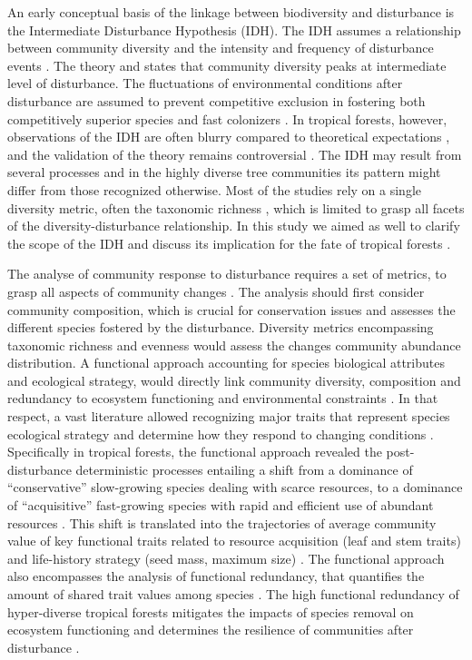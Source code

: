 \documentclass[fleqn,10pt]{ArtEcoFoG} %
\begin{document}
An early conceptual basis of the linkage between biodiversity and
disturbance is the Intermediate Disturbance Hypothesis (IDH). The IDH
assumes a relationship between community diversity and the intensity and
frequency of disturbance events \citep{Connell1978}. The theory and
states that community diversity peaks at intermediate level of
disturbance. The fluctuations of environmental conditions after
disturbance are assumed to prevent competitive exclusion in fostering
both competitively superior species and fast colonizers
\citep{Shea2004, Pulsford2016}. In tropical forests, however,
observations of the IDH are often blurry compared to theoretical
expectations \citep{Hugues2007, Sheil2003, Norden2017}, and the
validation of the theory remains controversial
\citep{Hubbell2001, Fox2013, Sheil2013}. The IDH may result from several
processes and in the highly diverse tree communities its pattern might
differ from those recognized otherwise. Most of the studies rely on a
single diversity metric, often the taxonomic richness
\citep{Molino2001}, which is limited to grasp all facets of the
diversity-disturbance relationship. In this study we aimed as well to
clarify the scope of the IDH and discuss its implication for the fate of
tropical forests \citep{Sheil2003, Shea2004}.

The analyse of community response to disturbance requires a set of
metrics, to grasp all aspects of community changes
\citep{Sheil2003, Shea2004, Mayfield2010}. The analysis should first
consider community composition, which is crucial for conservation issues
\citep{Lavorel2002, Bellwood2006} and assesses the different species
fostered by the disturbance. Diversity metrics encompassing taxonomic
richness and evenness would assess the changes community abundance
distribution. A functional approach accounting for species biological
attributes and ecological strategy, would directly link community
diversity, composition and redundancy to ecosystem functioning and
environmental constraints \citep{Violle2007b, Baraloto2012a}. In that
respect, a vast literature allowed recognizing major traits that
represent species ecological strategy and determine how they respond to
changing conditions \citep{Diaz2005}. Specifically in tropical forests,
the functional approach revealed the post-disturbance deterministic
processes entailing a shift from a dominance of ``conservative''
slow-growing species dealing with scarce resources, to a dominance of
``acquisitive'' fast-growing species with rapid and efficient use of
abundant resources \citep{Rees2001, Reich2014, Herault2011}. This shift
is translated into the trajectories of average community value of key
functional traits related to resource acquisition (leaf and stem traits)
and life-history strategy (seed mass, maximum size)
\citep{Wright2004, TerSteege2006, Westoby2006a, Chave2009b}. The
functional approach also encompasses the analysis of functional
redundancy, that quantifies the amount of shared trait values among
species \citep{Carmona2016}. The high functional redundancy of
hyper-diverse tropical forests \citep{Bellwood2006} mitigates the
impacts of species removal on ecosystem functioning and determines the
resilience of communities after disturbance
\citep{Elmqvist2003, Diaz2005}.
\end{document}
